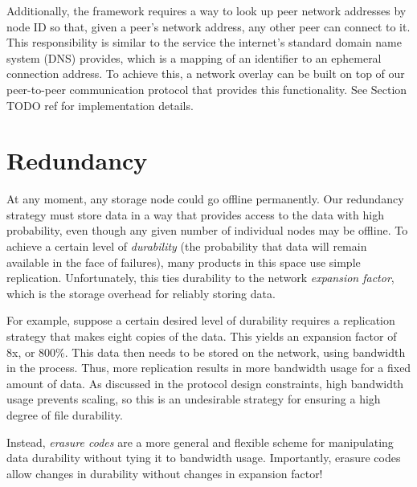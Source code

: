 \documentclass[11pt,fleqn,openany]{book}
\newcommand{\todo}[1]{{\color{red} TODO #1 }}
\begin{document}
Additionally, the framework requires a way to look up peer network addresses
by node ID so that, given a peer's network address, any other peer can connect
to it. This responsibility is similar to the service the internet's standard
domain name system (DNS) provides, which is a mapping of an identifier to an
ephemeral connection address. To achieve this, a network overlay can be
built on top of our peer-to-peer communication protocol that provides this
functionality. See Section \todo{ref} for implementation details.

\section{Redundancy}

At any moment, any storage node could go offline permanently. Our redundancy
strategy must store data in a way that provides access to the data with high
probability, even though any given number of individual nodes may be offline. To
achieve a certain level of {\em durability} (the probability that data will
remain available in the face of failures), many products in this space use
simple replication. Unfortunately, this ties durability to the network {\em
expansion factor}, which is the storage overhead for reliably storing data.

For example, suppose a certain desired level of durability requires a
replication strategy that makes eight copies of the data. This yields an
expansion factor of 8x, or 800\%. This data then needs to be stored on the
network, using bandwidth in the process. Thus, more replication results in more
bandwidth usage for a fixed amount of data. As discussed in the protocol design
constraints, high bandwidth usage prevents scaling, so this is an undesirable
strategy for ensuring a high degree of file durability.

Instead, {\em erasure
codes} are a more general and flexible scheme for manipulating data
durability without tying it to bandwidth usage. Importantly, erasure codes allow
changes in durability without changes in expansion factor!
\end{document}
